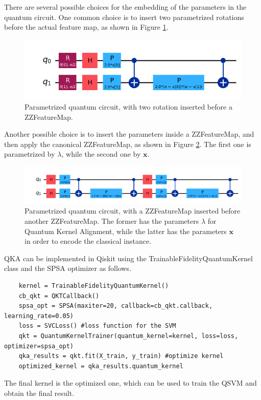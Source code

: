 \documentclass[12pt]{article}
\begin{document}
There are several possible choices for the embedding of the parameters in the quantum circuit. One common choice is to insert two parametrized rotations before the actual feature map, as shown in Figure \ref{fig:param rotation}. 
\begin{figure}[h!]
    \centering
    \includegraphics[width=\textwidth]{images/rotationsbeforeZZ.png}
    \caption{Parametrized quantum circuit, with two rotation inserted before a ZZFeatureMap.}
    \label{fig:param rotation}
\end{figure}
Another possible choice is to insert the parameters inside a ZZFeatureMap, and then apply the canonical ZZFeatureMap, as shown in Figure \ref{fig:ZZafterZZ}. The first one is parametrized by $\lambda$, while the second one by $\mathbf{x}$.
\begin{figure}[h!]
    \centering
    \includegraphics[width=\textwidth]{images/ZZafterZZ.png}
    \caption{Parametrized quantum circuit, with a ZZFeatureMap inserted before another ZZFeatureMap. The former has the parameters $\lambda$ for Quantum Kernel Alignment, while the latter has the parameters $\mathbf{x}$ in order to encode the classical instance.}
    \label{fig:ZZafterZZ}
\end{figure}

QKA can be implemented in Qiskit using the TrainableFidelityQuantumKernel class and the SPSA optimizer as follows. 
\begin{lstlisting}
    kernel = TrainableFidelityQuantumKernel()
    cb_qkt = QKTCallback()
    spsa_opt = SPSA(maxiter=20, callback=cb_qkt.callback, learning_rate=0.05)
    loss = SVCLoss() #loss function for the SVM
    qkt = QuantumKernelTrainer(quantum_kernel=kernel, loss=loss, optimizer=spsa_opt)
    qka_results = qkt.fit(X_train, y_train) #optimize kernel
    optimized_kernel = qka_results.quantum_kernel
\end{lstlisting}
The final kernel is the optimized one, which can be used to train the QSVM and obtain the final result. 
\end{document}
